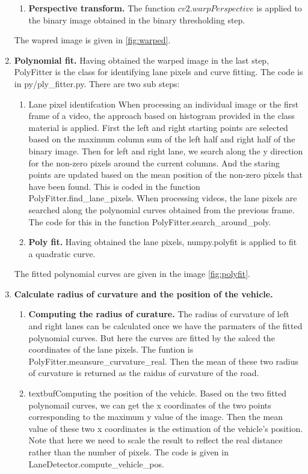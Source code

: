 \documentclass[12pt]{article}
\begin{document}
\begin{enumerate}
\begin{enumerate}
			\item \textbf{Perspective transform.} The function $cv2.warpPerspective$ is applied to the binary image obtained in the binary thresholding step.
		\end{enumerate}
	The wapred image is given in \ref{fig:warped}.
	
	\item \textbf{Polynomial fit.} Having obtained the warped image in the last step, PolyFitter is the class for identifying lane pixels and curve fitting. The code is in py/ply\_fitter.py. There are two sub steps:
		\begin{enumerate}
			\item {Lane pixel identifcation} When processing an individual image or the first frame of a video, the approach based on histogram provided in the class material is applied. First the left and right starting points are selected based on the maximum column sum of the left half and right half of the binary image. Then for left and right lane, we search along the y direction for the non-zero pixels around the current columns. And the staring points are updated based on the mean position of the non-zero pixels that have been found. This is coded in the function PolyFitter.find\_lane\_pixels. When processing videos, the lane pixels are searched along the polynomial curves obtained from the previous frame. The code for this in the function PolyFitter.search\_around\_poly.
			
			\item \textbf {Poly fit.} Having obtained the lane pixels, numpy.polyfit is applied to fit a quadratic curve.
		\end{enumerate}
	The fitted polynomial curves are given in the image \ref{fig:polyfit}.
	
	
	\item \textbf{Calculate radius of curvature and the position of the vehicle.} 
		\begin{enumerate}
			\item \textbf{Computing the radius of curature.} The radius of curvature of left and right lanes can be calculated once we have the parmaters of the fitted polynomial curves. But here the curves are fitted by the salced the coordinates of the lane pixels. The funtion is PolyFitter.meansure\_curvature\_real. Then the mean of these two radius of curvature is returned as the raidus of curvature of the road. 
			
			\item textbuf{Computing the position of the vehicle.} Based on the two fitted polynomail curves, we can get the x coordinates of the two points corresponding to the maximum y value of the image. Then the mean value of these two x coordinates is the estimation of the vehicle's position. Note that here we need to scale the result to reflect the real distance rather than the number of pixels. The code is given in LaneDetector.compute\_vehicle\_pos.
		\end{enumerate}
	

\end{enumerate}
\end{document}

